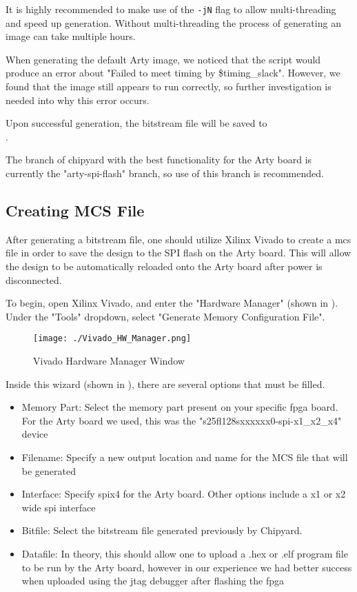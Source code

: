 	It is highly recommended to make use of the \texttt{-jN} flag to allow multi-threading and speed up generation. 
	Without multi-threading the process of generating an image can take multiple hours.
	
	When generating the default Arty image, we noticed that the script would produce an error about "Failed to meet timing by \$timing\_slack". 
	However, we found that the image still appears to run correctly, so further investigation is needed into why this error occurs.
	
	Upon successful generation, the bitstream file will be saved to \\ . 
	
	The branch of chipyard with the best functionality for the Arty board is currently the "arty-spi-flash" branch, so use of this branch is recommended.
	
\subsection{Creating MCS File}\label{sec:Creating_MCS_file}
	After generating a bitstream file, one should utilize Xilinx Vivado to create a \gls{mcs} file in order to save the design to the SPI flash on the Arty board. 
	This will allow the design to be automatically reloaded onto the Arty board after power is disconnected.
	
	To begin, open Xilinx Vivado, and enter the "Hardware Manager" (shown in ). Under the "Tools" dropdown, select "Generate Memory Configuration File".
	\begin{figure}[h!tbp]
		\centering
		\texttt{[image: ./Vivado\_HW\_Manager.png]}
		\caption{Vivado Hardware Manager Window}
		\label{fig:Vivado_HW_Manager}
	\end{figure}

	Inside this wizard (shown in ), there are several options that must be filled.
	\begin{itemize}
		\item Memory Part: Select the memory part present on your specific \Gls{fpga} board. For the Arty board we used, this was the "s25fl128sxxxxxx0-spi-x1\_x2\_x4" device
		\item Filename: Specify a new output location and name for the MCS file that will be generated
		\item Interface: Specify \Gls{spi}x4 for the Arty board. Other options include a x1 or x2 wide \Gls{spi} interface
		\item Bitfile: Select the bitstream file generated previously by Chipyard.
		\item Datafile: In theory, this should allow one to upload a .hex or .elf program file to be run by the Arty board, however in our experience we had better success when uploaded using the \Gls{jtag} debugger after flashing the \Gls{fpga}
	\end{itemize}

